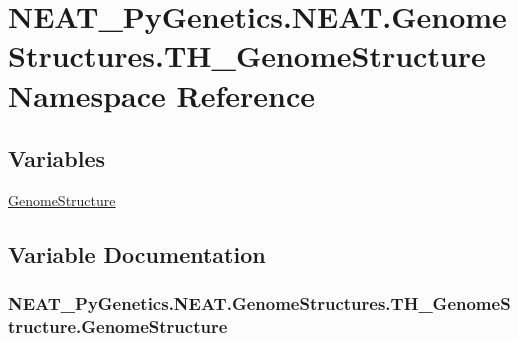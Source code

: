 \hypertarget{namespaceNEAT__PyGenetics_1_1NEAT_1_1GenomeStructures_1_1TH__GenomeStructure}{}\section{N\+E\+A\+T\+\_\+\+Py\+Genetics.\+N\+E\+A\+T.\+Genome\+Structures.\+T\+H\+\_\+\+Genome\+Structure Namespace Reference}
\label{namespaceNEAT__PyGenetics_1_1NEAT_1_1GenomeStructures_1_1TH__GenomeStructure}
\subsection*{Variables}
\begin{DoxyCompactItemize}
\item 
\hyperlink{namespaceNEAT__PyGenetics_1_1NEAT_1_1GenomeStructures_1_1TH__GenomeStructure_a956512ed36d4e25951075dc3e3ec8a8b}{Genome\+Structure}
\end{DoxyCompactItemize}


\subsection{Variable Documentation}
\subsubsection[{\texorpdfstring{Genome\+Structure}{GenomeStructure}}]{\setlength{\rightskip}{0pt plus 5cm}N\+E\+A\+T\+\_\+\+Py\+Genetics.\+N\+E\+A\+T.\+Genome\+Structures.\+T\+H\+\_\+\+Genome\+Structure.\+Genome\+Structure}\hypertarget{namespaceNEAT__PyGenetics_1_1NEAT_1_1GenomeStructures_1_1TH__GenomeStructure_a956512ed36d4e25951075dc3e3ec8a8b}{}\label{namespaceNEAT__PyGenetics_1_1NEAT_1_1GenomeStructures_1_1TH__GenomeStructure_a956512ed36d4e25951075dc3e3ec8a8b}
